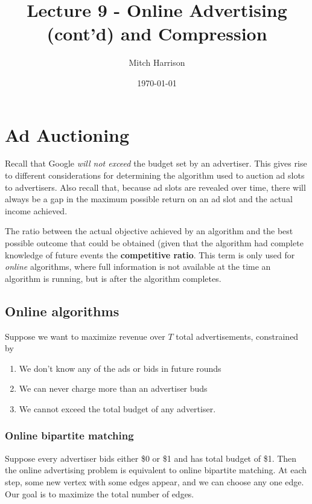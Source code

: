 \documentclass[titlepage, 12pt, leqno]{article}
\title{\Huge{Lecture 9 - Online Advertising (cont'd) and Compression}}
\author{\large{Mitch Harrison}}
\date{\today}
\begin{document}
\setlength{\parskip}{1\baselineskip}
\setlength{\parindent}{15pt}
\maketitle
\tableofcontents
\newpage


\section{Ad Auctioning}

Recall that Google \textit{will not exceed} the budget set by an advertiser. This
gives rise to different considerations for determining the algorithm used to 
auction ad slots to advertisers. Also recall that, because ad slots are revealed
over time, there will always be a gap in the maximum possible return on an ad 
slot and the actual income achieved.

\begin{definition}
    The ratio between the actual objective achieved by an algorithm and the
    best possible outcome that could be obtained (given that the algorithm had
    complete knowledge of future events the \textbf{competitive ratio}. This term
    is only used for \textit{online} algorithms, where full information is not
    available at the time an algorithm is running, but is after the algorithm
    completes.
\end{definition}

\subsection{Online algorithms}
Suppose we want to maximize revenue over $T$ total advertisements, constrained by
\begin{enumerate}
    \item We don't know any of the ads or bids in future rounds
    \item We can never charge more than an advertiser buds
    \item We cannot exceed the total budget of any advertiser.
\end{enumerate}

\subsubsection{Online bipartite matching}
Suppose every advertiser bids either \$0 or \$1 and has total budget of \$1. Then
the online advertising problem is equivalent to online bipartite matching. At
each step, some new vertex with some edges appear, and we can choose any one edge.
Our goal is to maximize the total number of edges.
\end{document}
